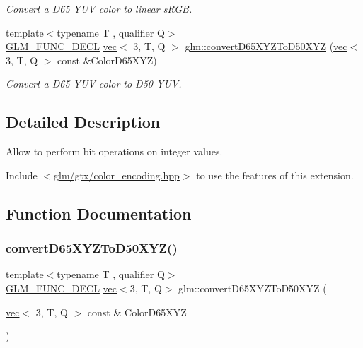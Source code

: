 \begin{DoxyCompactItemize}
\begin{DoxyCompactList}\small\item\em Convert a D65 Y\+UV color to linear s\+R\+GB. \end{DoxyCompactList}\item 
{\footnotesize template$<$typename T , qualifier Q$>$ }\\\hyperlink{setup_8hpp_ab2d052de21a70539923e9bcbf6e83a51}{G\+L\+M\+\_\+\+F\+U\+N\+C\+\_\+\+D\+E\+CL} \hyperlink{structglm_1_1vec}{vec}$<$ 3, T, Q $>$ \hyperlink{group__gtx__color__encoding_gad12f4f65022b2c80e33fcba2ced0dc48}{glm\+::convert\+D65\+X\+Y\+Z\+To\+D50\+X\+YZ} (\hyperlink{structglm_1_1vec}{vec}$<$ 3, T, Q $>$ const \&Color\+D65\+X\+YZ)
\begin{DoxyCompactList}\small\item\em Convert a D65 Y\+UV color to D50 Y\+UV. \end{DoxyCompactList}\end{DoxyCompactItemize}


\subsection{Detailed Description}
Allow to perform bit operations on integer values. 

Include $<$\hyperlink{color__encoding_8hpp}{glm/gtx/color\+\_\+encoding.\+hpp}$>$ to use the features of this extension. 

\subsection{Function Documentation}
\mbox{\label{group__gtx__color__encoding_gad12f4f65022b2c80e33fcba2ced0dc48}} 
\subsubsection{\texorpdfstring{convert\+D65\+X\+Y\+Z\+To\+D50\+X\+Y\+Z()}{convertD65XYZToD50XYZ()}}
{\footnotesize\ttfamily template$<$typename T , qualifier Q$>$ \\
\hyperlink{setup_8hpp_ab2d052de21a70539923e9bcbf6e83a51}{G\+L\+M\+\_\+\+F\+U\+N\+C\+\_\+\+D\+E\+CL} \hyperlink{structglm_1_1vec}{vec}$<$3, T, Q$>$ glm\+::convert\+D65\+X\+Y\+Z\+To\+D50\+X\+YZ (\begin{DoxyParamCaption}\item[{\hyperlink{structglm_1_1vec}{vec}$<$ 3, T, Q $>$ const \&}]{Color\+D65\+X\+YZ }\end{DoxyParamCaption})}



